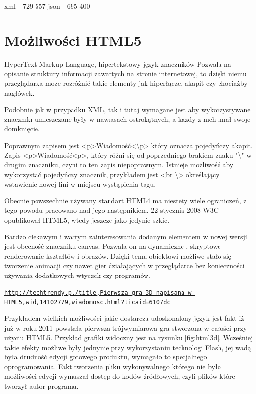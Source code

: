 xml - 729  557
json - 695  400


\section{Możliwości HTML5}
\label{sec:html5}
\nocite{xml50}
\nocite{proxml}
\nocite{pre1}
\nocite{pre2}
\nocite{googlemapsbegin}
\nocite{proHTML5}
HyperText Markup Language,  hipertekstowy język znaczników
Pozwala na opisanie struktury informacji zawartych na stronie internetowej, to dzięki niemu przeglądarka moze rozróżnić takie elementy jak hiperłącze, akapit czy chociażby nagłówek.

Podobnie jak w przypadku XML, tak i tutaj wymagane jest aby wykorzystywane znaczniki umieszczane były w nawiasach ostrokątnych, a każdy z nich miał swoje domknięcie.

Poprawnym zapisem jest <p>Wiadomość<\textbackslash p> który oznacza pojedyńczy akapit. Zapis <p>Wiadomość<p>, który różni się od poprzedniego brakiem znaku "\textbackslash" w drugim znaczniku, czyni to ten zapis niepoprawnym. Istnieje możliwość aby wykorzystać pojedyńczy znacznik, przykładem jest <br \textbackslash> określający wstawienie nowej lini w miejscu wystąpienia tagu.

Obecnie powszechnie używany standart HTML4 ma niestety wiele ograniczeń, z tego powodu pracowano nad jego następnikiem. 22 stycznia 2008 W3C opublikował HTML5, wtedy jeszcze jako jedynie szkic.

Bardzo ciekawym i wartym zainteresowania dodanym elementem w nowej wersji jest obecność znaczniku canvas. Pozwala on na dynamiczne , skryptowe renderowanie kształtów i obrazów. Dzięki temu obiektowi możliwe stało się tworzenie animacji czy nawet gier działających w przeglądarce bez konieczności używania dodatkowych wtyczek czy programów.

\underline{\texttt{http://techtrendy.pl/title,Pierwsza-gra-3D-napisana-w-HTML5,wid,14102779,wiadomosc.html?ticaid=6107dc}}

Przykładem wielkich możliwości jakie dostarcza udoskonalony język jest fakt iż już w roku 2011 powstała pierwsza trójwymiarowa gra stworzona w całości przy użyciu HTML5. Przykład grafiki widoczny jest na rysunku \ref{fig:html3d}.
Wcześniej takie efekty możliwe były jednynie przy wykorzystaniu technologi Flash, jej wadą była drudność edycji gotowego produktu, wymagało to specjalnego oprogramowania. Fakt tworzenia pliku wykonywalnego którego nie było możliwości edycji wymuszał dostęp do kodów źródłowych, czyli plików które tworzył autor programu.

